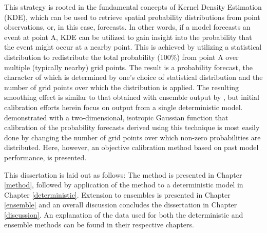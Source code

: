 This strategy is rooted in the fundamental concepts of Kernel Density Estimation (KDE), which can be used to retrieve spatial probability distributions from point observations, or, in this case, forecasts.
In other words, if a model forecasts an event at point A, KDE can be utilized to gain insight into the probability that the event might occur at a nearby point.
This is achieved by utilizing a statistical distribution to redistribute the total probability (100\%) from point A over multiple (typically nearby) grid points.
The result is a probability forecast, the character of which is determined by one's choice of statistical distribution and the number of grid points over which the distribution is applied.
The resulting smoothing effect is similar to that obtained with ensemble output by \cite{Wilks2002}, but initial calibration efforts herein focus on output from a single deterministic model.
\cite{Sobash2011} demonstrated with a two-dimensional, isotropic Gaussian function that calibration of the probability forecasts derived using this technique is most easily done by changing the number of grid points over which non-zero probabilities are distributed.
Here, however, an objective calibration method based on past model performance, is presented.


This dissertation is laid out as follows: The method is presented in Chapter \ref{method}, followed by application of the method to a deterministic model in Chapter \ref{deterministic}.
Extension to ensembles is presented in Chapter \ref{ensemble} and an overall discussion concludes the dissertation in Chapter \ref{discussion}.
An explanation of the data used for both the deterministic and ensemble methods can be found in their respective chapters.


